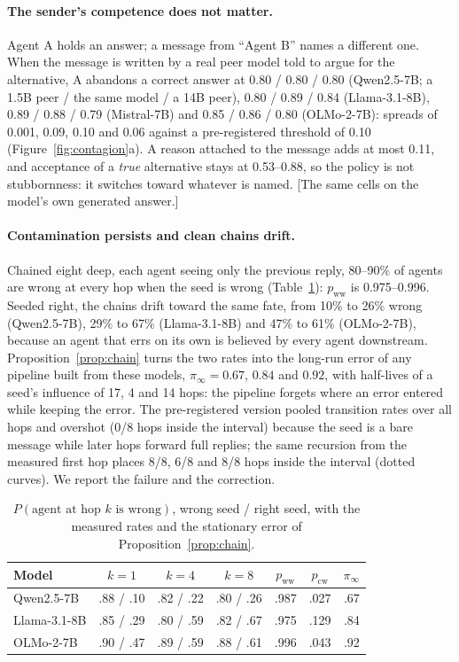 \documentclass{article}
\newcommand{\pending}[1]{\textcolor{blue!70!black}{[#1]}}
\newcommand{\pww}{p_{\mathrm{ww}}}
\newcommand{\pcw}{p_{\mathrm{cw}}}
\newcommand{\piinf}{\pi_{\infty}}
\begin{document}
\paragraph{The sender's competence does not matter.} Agent A holds an answer; a message from ``Agent B'' names a different one. When the message is written by a real peer model told to argue for the alternative, A abandons a correct answer at 0.80 / 0.80 / 0.80 (Qwen2.5-7B; a 1.5B peer / the same model / a 14B peer), 0.80 / 0.89 / 0.84 (Llama-3.1-8B), 0.89 / 0.88 / 0.79 (Mistral-7B) and 0.85 / 0.86 / 0.80 (OLMo-2-7B): spreads of 0.001, 0.09, 0.10 and 0.06 against a pre-registered threshold of 0.10 (Figure~\ref{fig:contagion}a). A reason attached to the message adds at most 0.11, and acceptance of a \emph{true} alternative stays at 0.53--0.88, so the policy is not stubbornness: it switches toward whatever is named. \pending{The same cells on the model's own generated answer.}
\paragraph{Contamination persists and clean chains drift.} Chained eight deep, each agent seeing only the previous reply, 80--90\% of agents are wrong at every hop when the seed is wrong (Table~\ref{tab:chain}): $\pww$ is 0.975--0.996. Seeded right, the chains drift toward the same fate, from 10\% to 26\% wrong (Qwen2.5-7B), 29\% to 67\% (Llama-3.1-8B) and 47\% to 61\% (OLMo-2-7B), because an agent that errs on its own is believed by every agent downstream. Proposition~\ref{prop:chain} turns the two rates into the long-run error of any pipeline built from these models, $\piinf=0.67$, $0.84$ and $0.92$, with half-lives of a seed's influence of 17, 4 and 14 hops: the pipeline forgets where an error entered while keeping the error. The pre-registered version pooled transition rates over all hops and overshot (0/8 hops inside the interval) because the seed is a bare message while later hops forward full replies; the same recursion from the measured first hop places 8/8, 6/8 and 8/8 hops inside the interval (dotted curves). We report the failure and the correction.
\begin{table}[t]\centering\scriptsize
\begin{tabular}{lcccccc}
\toprule
Model & $k=1$ & $k=4$ & $k=8$ & $\pww$ & $\pcw$ & $\piinf$ \\
\midrule
Qwen2.5-7B & .88 / .10 & .82 / .22 & .80 / .26 & .987 & .027 & .67 \\
Llama-3.1-8B & .85 / .29 & .80 / .59 & .82 / .67 & .975 & .129 & .84 \\
OLMo-2-7B & .90 / .47 & .89 / .59 & .88 / .61 & .996 & .043 & .92 \\
\bottomrule
\end{tabular}
\caption{$P(\text{agent at hop }k\text{ is wrong})$, wrong seed / right seed, with the measured rates and the stationary error of Proposition~\ref{prop:chain}.}
\label{tab:chain}
\end{table}
\end{document}
